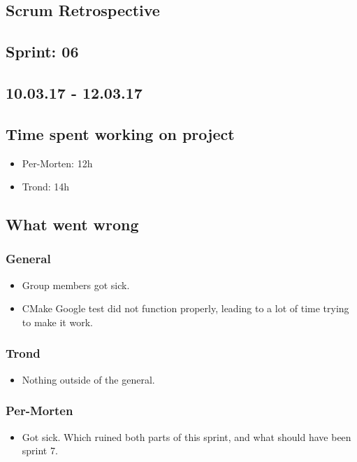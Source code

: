 \documentclass{article}
\begin{document}
\begin{center}
\section*{Scrum Retrospective}
\subsection*{Sprint: 06}
\subsection*{10.03.17 - 12.03.17}
\end{center}
\bigskip

\subsection*{Time spent working on project}
\begin{itemize}
    \item
    Per-Morten: 12h

    \item
    Trond:      14h
\end{itemize}

\subsection*{What went wrong}
\subsubsection*{General}
\begin{itemize}
    \item
    Group members got sick.

    \item
    CMake Google test did not function properly, leading to a lot of time trying to make it work.
\end{itemize}

\subsubsection*{Trond}
\begin{itemize}
    \item 
    Nothing outside of the general.
\end{itemize}

\subsubsection*{Per-Morten}
\begin{itemize}
    \item
    Got sick. Which ruined both parts of this sprint, and what should have been sprint 7.
\end{itemize}
\end{document}
